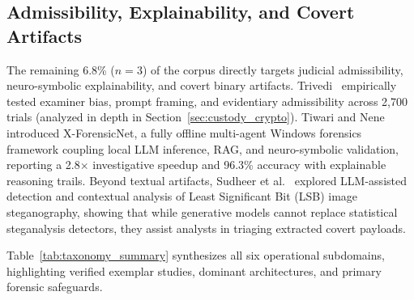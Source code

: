 \subsection{Admissibility, Explainability, and Covert Artifacts}
The remaining 6.8\% ($n=3$) of the corpus directly targets judicial admissibility, neuro-symbolic explainability, and covert binary artifacts. Trivedi~\cite{trivedi2026_when} empirically tested examiner bias, prompt framing, and evidentiary admissibility across 2,700 trials (analyzed in depth in Section~\ref{sec:custody_crypto}). Tiwari and Nene~\cite{tiwari2026_xforensicnet} introduced X-ForensicNet, a fully offline multi-agent Windows forensics framework coupling local LLM inference, RAG, and neuro-symbolic validation, reporting a 2.8$\times$ investigative speedup and 96.3\% accuracy with explainable reasoning trails. Beyond textual artifacts, Sudheer et al.~\cite{sudheer2026_least} explored LLM-assisted detection and contextual analysis of Least Significant Bit (LSB) image steganography, showing that while generative models cannot replace statistical steganalysis detectors, they assist analysts in triaging extracted covert payloads.

Table~\ref{tab:taxonomy_summary} synthesizes all six operational subdomains, highlighting verified exemplar studies, dominant architectures, and primary forensic safeguards.


